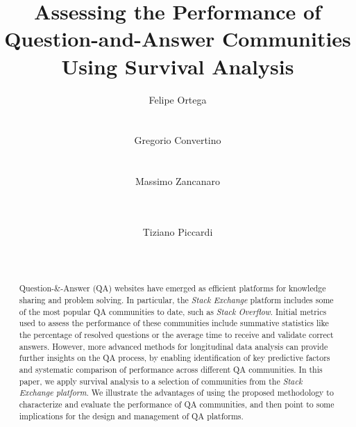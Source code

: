 \documentclass{chi2012}
\begin{document}
\title{Assessing the Performance of Question-and-Answer Communities Using Survival Analysis}

\author{
  \alignauthor Felipe Ortega\\
    \\
    \\
\alignauthor Gregorio Convertino\\
    \\
    \\
\alignauthor Massimo Zancanaro\\
    \\
    \\
\and
  \alignauthor Tiziano Piccardi\\
    \\
    \\
}

\maketitle

\begin{abstract}
Question-\&-Answer (QA) websites have emerged as efficient platforms for knowledge sharing and problem solving. In particular, the \textit{Stack Exchange} platform includes some of the most popular QA communities to date, such as \textit{Stack Overflow}. Initial metrics used to assess the performance of these communities include summative statistics like the percentage of resolved questions or the average time to receive and validate correct answers. However, more advanced methods for longitudinal data analysis can provide further insights on the QA process, by enabling identification of key predictive factors and systematic comparison of performance across different QA communities. In this paper, we apply survival analysis to a selection of communities from the \textit{Stack Exchange platform}. We illustrate the advantages of using the proposed methodology to characterize and evaluate the performance of QA communities, and then point to some implications for the design and management of QA platforms.  
\end{abstract}
\end{document}
